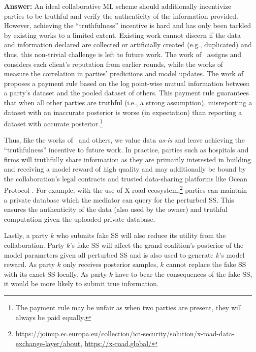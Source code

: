 \documentclass{article}
\theoremstyle{plain}
\theoremstyle{definition}
\theoremstyle{remark}
\renewcommand{\citet}[1]{\cite{#1}}
\begin{document}
\textbf{Answer:} 
An ideal collaborative ML scheme should additionally incentivize parties to be truthful and verify the authenticity of the information provided. However, achieving the ``truthfulness'' incentive is hard and has only been tackled by existing works to a limited extent. 
Existing work cannot discern if the data and information declared are collected or artificially created (e.g., duplicated) and thus, this non-trivial challenge is left to future work.
The work of~\citet{lyu2020credibility} assigns and considers each client's reputation from earlier rounds, while the works of~\citet{liu2020elicit,lv2021data} measure the correlation in parties' predictions and model updates. The work of~\citet{chen2020truthful} proposes a payment rule based on the log point-wise mutual information between a party's dataset and the pooled dataset of others. This payment rule guarantees that when all other parties are truthful (i.e., a strong assumption), misreporting a dataset with an inaccurate posterior is worse (in expectation) than reporting a dataset with accurate posterior.\footnote{The payment rule may be unfair as when two parties are present, they will always be paid equally.}

Thus, like the works of~\citet{ghorbani2019data,ghorbani2020,jia2019towards,nguyen22trade,simcollaborative,tay2021} and others, we value data \textit{as-is} and leave achieving the ``truthfulness'' incentive to future work. 
In practice, parties such as hospitals and firms will truthfully share information as they are primarily interested in building and receiving a  model reward of high quality and may additionally be bound by the collaboration's legal contracts and trusted data-sharing platforms like Ocean Protocol \cite{ocean-protocol}. 
For example, with the use of X-road ecosystem,\footnote{\url{https://joinup.ec.europa.eu/collection/ict-security/solution/x-road-data-exchange-layer/about}, \url{https://x-road.global/}} parties can maintain a private database which the mediator can query for the perturbed SS. This ensures the authenticity of the data (also used by the owner) and truthful computation given the uploaded private database.

Lastly, a party $k$ who submits fake SS will also reduce its utility from the collaboration. Party $k$'s fake SS will affect the grand coalition's posterior of the model parameters given all perturbed SS and is also used to generate $k$'s model reward. As party $k$ only receives posterior samples, $k$ cannot replace the fake SS with its exact SS locally. As party $k$ have to bear the consequences of the fake SS, it would be more likely to submit true information. \\
\end{document}
